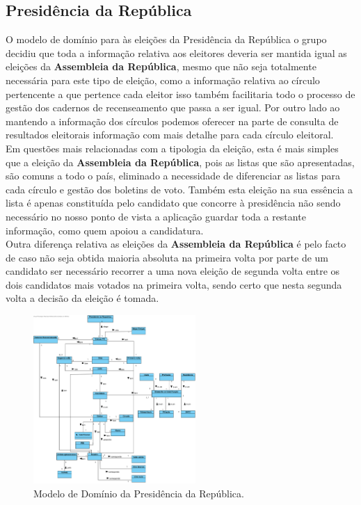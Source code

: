 \documentclass[a4paper,12pt]{report}
\begin{document}
\newpage
\subsection{Presidência da República}
O modelo de domínio para às eleições da Presidência da República o grupo decidiu que toda a informação relativa aos eleitores deveria ser mantida igual as eleições da \textbf{Assembleia da República}, mesmo que não seja totalmente necessária para este tipo de eleição, como a informação relativa ao círculo pertencente a que pertence cada eleitor isso também facilitaria todo o processo de gestão dos cadernos de recenseamento que passa a ser igual. Por outro lado ao mantendo a informação dos círculos podemos oferecer na parte de consulta de resultados eleitorais informação com mais detalhe para cada círculo eleitoral.
\\\indent Em questões mais relacionadas com a tipologia da eleição, esta é mais simples que a eleição da \textbf{Assembleia da República}, pois as listas que são apresentadas, são comuns a todo o país, eliminado a necessidade de diferenciar as listas para cada círculo e gestão dos boletins de voto. Também esta eleição na sua essência a lista é apenas constituída pelo candidato que concorre à presidência não sendo necessário no nosso ponto de vista a aplicação guardar toda a restante informação, como quem apoiou a candidatura.
\\\indent Outra diferença relativa as eleições da \textbf{Assembleia da República} é pelo facto de caso não seja obtida maioria absoluta na primeira volta por parte de um candidato ser necessário recorrer a uma nova eleição de segunda volta entre os dois candidatos mais votados na primeira volta, sendo certo que nesta segunda volta a decisão da eleição é tomada. 
\begin{figure}[h]
\begin{center}
	\includegraphics[width=0.55\textwidth]{media/modelodominio/pr.png}
	 \caption{Modelo de Domínio da Presidência da República.}
\end{center}
\end{figure}
\end{document}
